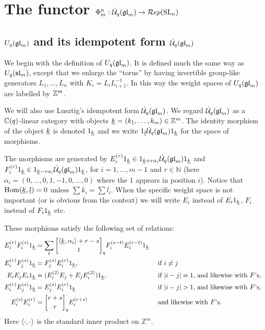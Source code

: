 \documentclass[11pt]{amsart}
\begin{document}
\section{The functor \texorpdfstring{$\Phi_m^n:\dU(\gl_m) \rightarrow \Rep(\SL_n)$}{Phi}}\label{sec:phi}

\subsection{\texorpdfstring{$ U_q(\gl_m)$}{U\_q gl\_m} and its idempotent form \texorpdfstring{$\dU(\gl_m)$}{}}\label{sec:idemform}

We begin with the definition of $ U_q(\gl_m)$.  It is defined much the same way as $ U_q(\sl_m) $, except that we enlarge the ``torus'' by having invertible group-like generators $ L_1, \dots, L_n $ with $ K_i = L_i L_{i+1}^{-1} $.  In this way the weight spaces of $ U_q(\gl_m) $ are labelled by $ \bZ^m $.

We will also use Lusztig's idempotent form $ \dU(\gl_m) $. We regard $\dU(\gl_m)$ as a $\bC(q)$-linear category with objects $ \ul{k} = (k_1, \dots, k_m) \in \mathbb Z^m $.  The identity morphism of the object $\ul{k}$ is denoted $\one_\ul{k}$  and we write $ \one_\ul{l} \dU(\gl_m) \one_\ul{k}$ for the space of morphisms.

The morphisms are generated by $E_i^{(r)} \one_{\ul{k}} \in \one_{\ul{k} + r \alpha_i} \dU(\gl_m) \one_{\ul{k}} $ and $ F_i^{(r)} \one_{\ul{k}} \in \one_{\ul{k} - r \alpha_i} \dU(\gl_m) \one_{\ul{k}}$, for $i=1, \dots, m-1$ and $r \in {\mathbb N}$ (here $\alpha_i = (0,\dots,0,1,-1,0,\dots,0)$ where the $1$ appears in position $i$). Notice that $\Hom(\ul{k}, \ul{l}) = 0 $ unless $\sum k_i = \sum l_i$. When the specific weight space is not important (or is obvious from the context) we will write $E_i$ instead of $E_i \one_{\ul{k}}$, $F_i$ instead of $F_i \one_{\ul{k}}$ etc.

These morphisms satisfy the following set of relations: 
\begin{align}
\label{rel:1} 
E_i^{(r)} F_i^{(s)} \one_{\ul{k}} &= \sum_t \qBinomial{\la \ul{k}, \alpha_i \ra + r - s}{t} F_i^{(s-t)} E_i^{(r-t)} \one_{\ul{k}} & & \\
\label{rel:2}  E_i^{(r)} F_j^{(s)} \one_{\ul{k}} &= F_j^{(s)} E_i^{(r)} \one_{\ul{k}}, & & \text{ if $i \ne j$} \\
\label{rel:3} E_iE_jE_i \one_{\ul{k}} &= (E_i^{(2)} E_j + E_j E_i^{(2)}) \one_{\ul{k}}, && \text{ if $ |i - j| = 1 $, and likewise with $F$'s,} \\
\label{rel:4} E_i^{(r)} E_j^{(s)} \one_{\ul{k}} &= E_j^{(s)} E_i^{(r)} \one_{\ul{k}} &&\text{ if $ |i-j| > 1$, and likewise with $F$'s,} \\
\label{rel:5} E_i^{(s)} E_i^{(r)} &= \qBinomial{r+s}{r} E_i^{(r+s)} && \text{ and likewise with $F$'s.}
\end{align}
Here $\la \cdot, \cdot \ra$ is the standard inner product on $\mathbb Z^m$.
\end{document}

